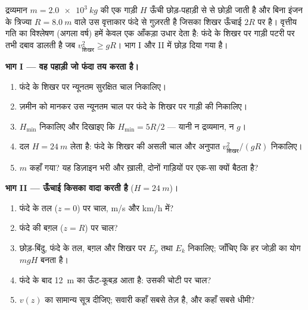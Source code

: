\begin{problem}
\label{pb:g11:mechanical-energy:1}
द्रव्यमान $m = \qty{2.0e3}{kg}$ की एक गाड़ी $H$ ऊँची छोड़-पहाड़ी से  से छोड़ी
जाती है और बिना इंजन के त्रिज्या $R = \qty{8.0}{m}$ वाले उस  वृत्ताकार फंदे से
गुज़रती है जिसका शिखर ऊँचाई $2R$ पर है। वृत्तीय गति का विश्लेषण (अगला
वर्ष) हमें केवल एक आँकड़ा उधार देता है: फंदे के शिखर पर गाड़ी पटरी पर तभी दबाव
डालती है जब $v_{\text{शिखर}}^2 \geq gR$। भाग I और II में  छोड़ दिया गया है।

\medskip
\noindent\textbf{भाग I --- वह पहाड़ी जो फंदा तय करता है।}
\begin{enumerate}
  \item फंदे के शिखर पर न्यूनतम सुरक्षित चाल निकालिए।
  \item ज़मीन को  मानकर उस न्यूनतम चाल पर फंदे के शिखर
        पर गाड़ी की  निकालिए।
  \item $H_{\min}$ निकालिए और दिखाइए कि $H_{\min} = 5R/2$ --- यानी न द्रव्यमान, न
        $g$।
  \item दल $H = \qty{24}{m}$ लेता है: फंदे के शिखर की असली चाल और अनुपात $v_{\text{शिखर}}^2/(gR)$
        निकालिए।
  \item $m$ कहाँ गया? यह डिज़ाइन भरी और ख़ाली, दोनों गाड़ियों पर एक-सा
        क्यों बैठता है?
\end{enumerate}

\medskip
\noindent\textbf{भाग II --- ऊँचाई किसका वादा करती है} ($H = \qty{24}{m}$)।
\begin{enumerate}[resume]
  \item फंदे के तल ($z = 0$) पर चाल, \unit{m/s} और \unit{km/h} में?
  \item फंदे की बग़ल ($z = R$) पर चाल?
  \item छोड़-बिंदु, फंदे के तल, बग़ल और शिखर पर $E_p$ तथा $E_k$
        निकालिए; जाँचिए कि हर जोड़ी का योग $mgH$ बनता है।
  \item फंदे के बाद \qty{12}{m} का ऊँट-कूबड़ आता है: उसकी चोटी पर चाल?
  \item $v(z)$ का सामान्य सूत्र दीजिए; सवारी कहाँ सबसे तेज़ है, और कहाँ सबसे
        धीमी?
\end{enumerate}


\end{problem}
